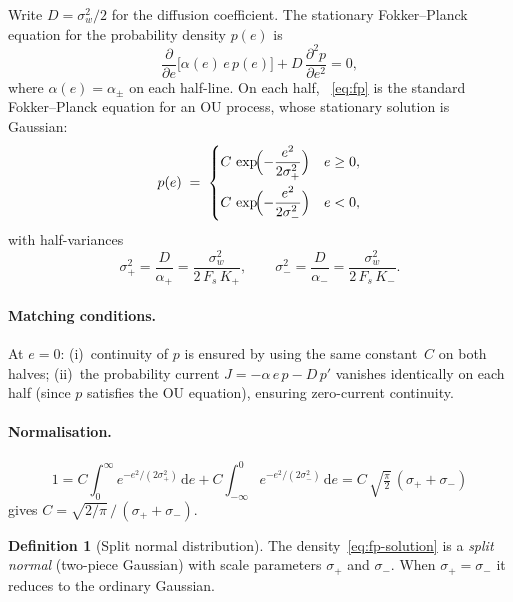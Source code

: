 \documentclass[11pt, a4paper]{article}
\theoremstyle{definition}
\newtheorem{definition}{Definition}[section]
\theoremstyle{plain}
\theoremstyle{remark}
\newcommand{\dd}{\,\mathrm{d}}                   %
\begin{document}
Write $D = \sigma_w^2/2$ for the diffusion coefficient.  The
stationary Fokker--Planck equation for the probability density
$p(e)$ is
\begin{equation}\label{eq:fp}
  \frac{\partial}{\partial e}\bigl[\alpha(e)\,e\,p(e)\bigr]
  + D\,\frac{\partial^2 p}{\partial e^2} = 0,
\end{equation}
where $\alpha(e) = \alpha_\pm$ on each half-line.  On each
half, ~\eqref{eq:fp} is the standard Fokker--Planck equation for an
OU process, whose stationary solution is Gaussian:
\begin{equation}\label{eq:fp-solution}
  p(e) \;=\;
  \begin{cases}
    \displaystyle
    C\,\exp\!\Bigl(-\frac{e^2}{2\sigma_+^2}\Bigr)
      & e \geq 0, \\[10pt]
    \displaystyle
    C\,\exp\!\Bigl(-\frac{e^2}{2\sigma_-^2}\Bigr)
      & e < 0,
  \end{cases}
\end{equation}
with half-variances
\begin{equation}\label{eq:half-var}
  \sigma_+^2 = \frac{D}{\alpha_+}
    = \frac{\sigma_w^2}{2\,F_s\,K_+},
  \qquad
  \sigma_-^2 = \frac{D}{\alpha_-}
    = \frac{\sigma_w^2}{2\,F_s\,K_-}.
\end{equation}

\paragraph{Matching conditions.}
At $e = 0$: (i)~continuity of $p$ is ensured by using the same
constant~$C$ on both halves; (ii)~the probability current
$J = -\alpha\,e\,p - D\,p'$ vanishes identically on each half
(since $p$ satisfies the OU equation), ensuring zero-current
continuity.

\paragraph{Normalisation.}
\begin{equation}\label{eq:split-norm}
  1 = C\!\int_0^\infty\!
      e^{-e^2/(2\sigma_+^2)}\dd e
    + C\!\int_{-\infty}^0\!
      e^{-e^2/(2\sigma_-^2)}\dd e
    = C\,\sqrt{\tfrac{\pi}{2}}\,
      (\sigma_+ + \sigma_-)
\end{equation}
gives
$C = \sqrt{2/\pi}\,/\,(\sigma_+ + \sigma_-)$.

\begin{definition}[Split normal distribution]%
\label{def:split-normal}
  The density~\eqref{eq:fp-solution} is a \emph{split normal}
  (two-piece Gaussian) with scale parameters $\sigma_+$ and
  $\sigma_-$.  When $\sigma_+ = \sigma_-$ it reduces to the
  ordinary Gaussian.
\end{definition}
\end{document}
